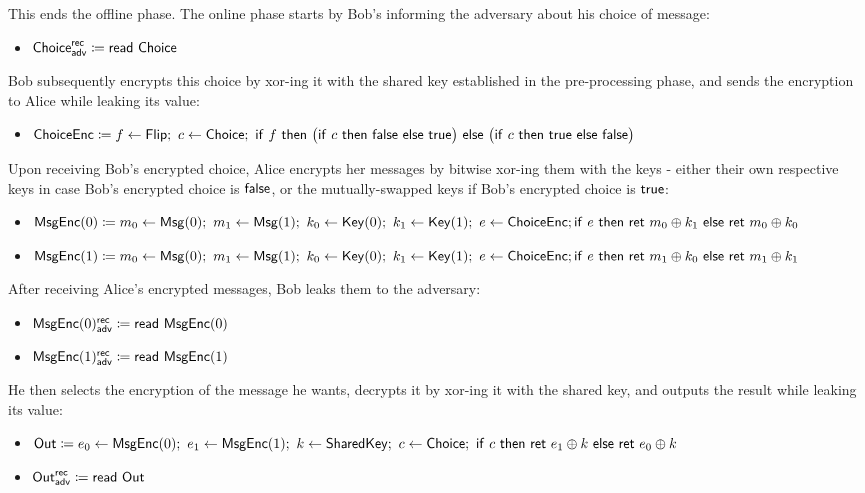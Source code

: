 This ends the offline phase. The online phase starts by Bob's informing the adversary about his choice of message:
\begin{itemize}
\item {\color{blue} $\mathsf{Choice}^{\mathsf{rec}}_{\mathsf{adv}} \coloneqq \mathsf{read} \ \mathsf{Choice}$}
\end{itemize}
Bob subsequently encrypts this choice by xor-ing it with the shared key established in the pre-processing phase, and sends the encryption to Alice while leaking its value:
\begin{itemize}
\item $\ChoiceEnc \coloneqq f \leftarrow \Flip; \ c \leftarrow \Choice; \ \ifte{f}{\big(\ifte{c}{\false}{\true}\big)}{\big(\ifte{c}{\true}{\false}\big)}$
\end{itemize}
Upon receiving Bob's encrypted choice, Alice encrypts her messages by bitwise xor-ing them with the keys - either their own respective keys in case Bob's encrypted choice is $\mathsf{false}$, or the mutually-swapped keys if Bob's encrypted choice is $\mathsf{true}$:
\begin{itemize}
\item $\mathsf{MsgEnc}(0) \coloneqq m_0 \leftarrow \mathsf{Msg}(0); \ m_1 \leftarrow \mathsf{Msg}(1); \ k_0 \leftarrow \mathsf{Key}(0); \ k_1 \leftarrow \mathsf{Key}(1); \ e \leftarrow \mathsf{ChoiceEnc}; \\ \mathsf{if} \ e \ \mathsf{then} \ \mathsf{ret} \ m_0 \oplus k_1 \ \mathsf{else} \ \mathsf{ret} \ m_0 \oplus k_0$
\item $\mathsf{MsgEnc}(1) \coloneqq m_0 \leftarrow \mathsf{Msg}(0); \ m_1 \leftarrow \mathsf{Msg}(1); \ k_0 \leftarrow \mathsf{Key}(0); \ k_1 \leftarrow \mathsf{Key}(1); \ e \leftarrow \mathsf{ChoiceEnc}; \\ \mathsf{if} \ e \ \mathsf{then} \ \mathsf{ret} \ m_1 \oplus k_0 \ \mathsf{else} \ \mathsf{ret} \ m_1 \oplus k_1$
\end{itemize}
After receiving Alice's encrypted messages, Bob leaks them to the adversary:
\begin{itemize}
\item {\color{blue} $\mathsf{MsgEnc}(0)^{\mathsf{rec}}_{\mathsf{adv}} \coloneqq \mathsf{read} \ \mathsf{MsgEnc}(0)$}
\item {\color{blue} $\mathsf{MsgEnc}(1)^{\mathsf{rec}}_{\mathsf{adv}} \coloneqq \mathsf{read} \ \mathsf{MsgEnc}(1)$}
\end{itemize}
He then selects the encryption of the message he wants, decrypts it by xor-ing it with the shared key, and outputs the result while leaking its value:
\begin{itemize}
\item $\mathsf{Out} \coloneqq e_0 \leftarrow \mathsf{MsgEnc}(0); \ e_1 \leftarrow \mathsf{MsgEnc}(1); \ k \leftarrow \mathsf{SharedKey}; \ c \leftarrow \mathsf{Choice}; \ \mathsf{if} \ c \ \mathsf{then} \ \mathsf{ret} \ e_1 \oplus k \ \mathsf{else} \ \mathsf{ret} \ e_0 \oplus k$
\item {\color{blue} $\mathsf{Out}^{\mathsf{rec}}_{\mathsf{adv}} \coloneqq \mathsf{read} \ \mathsf{Out}$}
\end{itemize}
